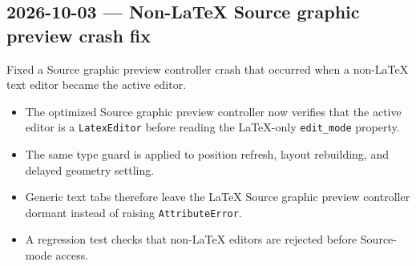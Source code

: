 \documentclass[a4paper]{article}
\title{}
\date{}
\author{Mohammad Rahmani}
\begin{document}
   \maketitle

   \begin{preview}
      \section*{2026-10-03 --- Non-LaTeX Source graphic preview crash fix}

      Fixed a Source graphic preview controller crash that occurred when a
      non-LaTeX text editor became the active editor.

      \begin{itemize}
         \item The optimized Source graphic preview controller now verifies
               that the active editor is a \texttt{LatexEditor} before reading
               the LaTeX-only \texttt{edit\_mode} property.
         \item The same type guard is applied to position refresh, layout
               rebuilding, and delayed geometry settling.
         \item Generic text tabs therefore leave the LaTeX Source graphic
               preview controller dormant instead of raising
               \texttt{AttributeError}.
         \item A regression test checks that non-LaTeX editors are rejected
               before Source-mode access.
      \end{itemize}
   \end{preview}

   
   
\end{document}
